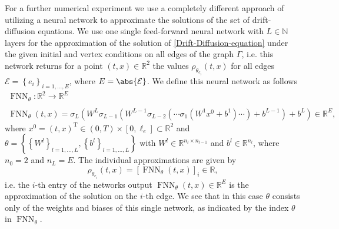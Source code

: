 For a further numerical experiment we use a completely different approach of utilizing a neural network to approximate the solutions of the set of drift-diffusion equations. We use one single feed-forward neural network with $L \in \mathbb{N}$ layers for the approximation of the solution of \cref{Drift-Diffusion-equation} under the given initial and vertex conditions on all edges of the graph $\Gamma$, i.e. this network returns for a point $\left(t,x\right) \in \mathbb{R}^2$ the values $\rho_{\theta_{e_i}}\left(t, x\right)$ for all edges $\mathcal{E} = \left\{ e_i \right\}_{i = 1, \ldots, E}$, where $E = \abs{\mathcal{E}}$. We define this neural network as follows
\begin{equation} 
    \label{one_for_all}
    \begin{gathered}
        \operatorname{FNN}_{\theta} \colon \mathbb{R}^2 \to \mathbb{R}^E \\
        \\
        \operatorname{FNN}_{\theta}\left(t, x\right) = \sigma_L\left(W^L \sigma_{L-1}\left(W^{L-1}\sigma_{L-2}\left(\cdots \sigma_{1}\left(W^{1}x^0 +b^1\right) \cdots\right) + b^{L-1}\right) + b^{L}\right) \in \mathbb{R}^E, 
    \end{gathered} 
\end{equation} 
where $x^0 = \left(t, x\right)^{\mathrm{T}} \in \left(0, T\right) \times \left[0, \ell_e\right] \subset \mathbb{R}^2$ and $\theta = \left\{ \left\{ W^l \right\}_{l = 1, \ldots, L}, \left\{ b^l \right\}_{l = 1, \ldots, L} \right\}$ with $W^l \in \mathbb{R}^{n_l \times n_{l-1}}$ and $b^l \in \mathbb{R}^{n_l}$, where $n_0 = 2$ and $n_L = E$. The individual approximations are given by 
\begin{equation*}
    \rho_{\theta_{e_i}}\left(t, x\right) = \left[ \operatorname{FNN}_{\theta}\left(t, x\right) \right]_i \in \mathbb{R},
\end{equation*}
i.e. the $i$-th entry of the networks output $\operatorname{FNN}_{\theta}\left(t, x\right) \in \mathbb{R}^E$ is the approximation of the solution on the $i$-th edge. We see that in this case $\theta$ consists only of the weights and biases of this single network, as indicated by the index $\theta$ in $\operatorname{FNN}_{\theta}$. \\
